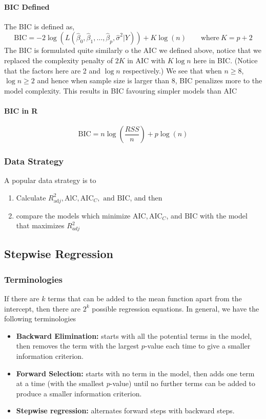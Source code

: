 \documentclass[10pt]{article}
\begin{document}
\paragraph{BIC Defined} The BIC is defined as,
\begin{equation*}
    \mathrm{BIC}=-2 \log \left(L\left(\hat{\beta}_{0}, \hat{\beta}_{1}, \ldots, \hat{\beta}_{p}, \hat{\sigma}^{2} | Y\right)\right)+K \log (n) \quad \quad \text{where} ~ K = p + 2
\end{equation*}
The BIC is formulated quite similarly o the AIC we defined above, notice that we replaced the complexity penalty of $2K$ in AIC with $K \log n$ here in BIC. (Notice that the factors here are 2 and $\log n$ respectively.) We see that when $n \geq 8$, $\log n \geq 2$ and hence when sample size is larger than 8, BIC penalizes more to the model complexity. \color{BurntOrange}This results in BIC favouring simpler models than AIC\color{Black}

\paragraph{BIC in R}
\begin{equation*}
    \mathrm{BIC} =n \log \left(\frac{R S S}{n}\right)+p \log (n)
\end{equation*}

\subsubsection{Data Strategy}
A popular data strategy is to
\begin{enumerate}
    \item Calculate $R_{\mathrm{ad} j}^{2}, \mathrm{AlC}, \mathrm{AIC}_C, \text { and } \mathrm{BIC}$, and then
    \item compare the models which minimize $\mathrm{AIC}, \mathrm{AIC}_C$, and $\mathrm{BIC}$ with the model that maximizes $R^2_{adj}$
\end{enumerate}

\subsection{Stepwise Regression}
\subsubsection{Terminologies}
If there are $k$ terms that can be added to the mean function apart from the intercept, then there are $2^k$ possible regression equations. In general, we have the following terminologies
\begin{itemize}
    \item \textbf{Backward Elimination:} starts with all the potential terms in the model, then removes the term with the largest $p$-value each time to give a smaller information criterion.
    \item \textbf{Forward Selection:} starts with no term in the model, then adds one term at a time (with the smallest $p$-value) until no further terms can be added to produce a smaller information criterion.
    \item \textbf{Stepwise regression:} alternates forward steps with backward steps. 
\end{itemize}
\end{document}
